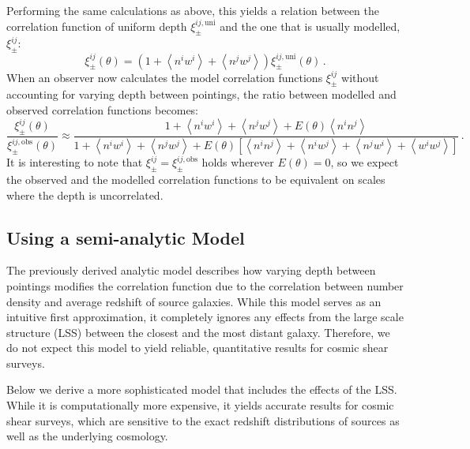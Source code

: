 \documentclass[referee]{aa} %
\renewcommand{\[}{\begin{equation}}
\renewcommand{\]}{\end{equation}}
\renewcommand{\rm}{\mathrm}
\def\la{\left<}
\def\ra{\right>}
\begin{document}
 Performing the same calculations as above, this yields a relation between the correlation function of uniform depth $\xi_\pm^{ij,\rm{uni}}$ and the one that is usually modelled, $\xi_\pm^{ij}$:
\begin{equation}
\xi_\pm^{ij}(\theta) = \left(1+\la n^iw^i\ra + \la n^jw^j\ra \right)\xi_\pm^{ij,\rm{uni}}(\theta)\, .
\end{equation}
When an observer now calculates the model correlation functions $\xi^{ij}_\pm$ without accounting for varying depth between pointings, the ratio between modelled and observed correlation functions becomes: \begin{equation}
\frac{\xi^{ij}_\pm(\theta)}{\xi_\pm^{ij,\rm{obs}}(\theta)} \approx \frac{1+\la n^iw^i\ra+\la n^jw^j\ra + E(\theta)\la n^in^j\ra}{1 + \la n^iw^i\ra + \la n^jw^j\ra + E(\theta)\left[\la n^in^j\ra + \la n^iw^j\ra + \la n^j w^i\ra + \la w^iw^j\ra\right]}
\, .
\end{equation}
It is interesting to note that $\xi^{ij}_\pm = \xi_\pm^{ij,\rm{obs}}$ holds wherever $E(\theta)=0$, so we expect the observed and the modelled correlation functions to be equivalent on scales where the depth is uncorrelated. 



\subsection{Using a semi-analytic Model}
\label{sec:xipm_semianalytic}
The previously derived analytic model describes how varying depth between pointings modifies the correlation function due to the correlation between number density and average redshift of source galaxies. While this model serves as an intuitive first approximation, it completely ignores any effects from the large scale structure (LSS) between the closest and the most distant galaxy. Therefore, we do not expect this model to yield reliable, quantitative results for cosmic shear surveys.

Below we derive a more sophisticated model that includes the effects of the LSS. While it is computationally more expensive, it yields accurate results for cosmic shear surveys, which are sensitive to the exact redshift distributions of sources as well as the underlying cosmology.
\end{document}
